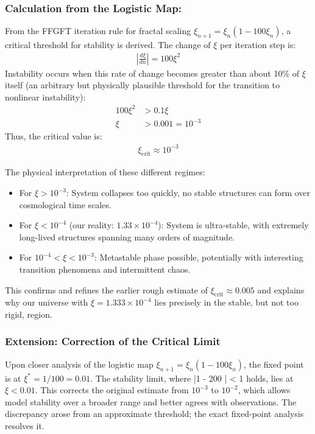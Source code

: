 \documentclass[12pt,a4paper]{article}
\begin{document}
	\subsubsection*{Calculation from the Logistic Map:}
	
	From the FFGFT iteration rule for fractal scaling $\xi_{n+1} = \xi_n (1 - 100\xi_n)$, a critical threshold for stability is derived. The change of $\xi$ per iteration step is:
	\begin{align*}
		\left|\frac{d\xi}{dn}\right| = 100\xi^2
	\end{align*}
	Instability occurs when this rate of change becomes greater than about 10\% of $\xi$ itself (an arbitrary but physically plausible threshold for the transition to nonlinear instability):
	\begin{align*}
		100\xi^2 &> 0.1\xi \\
		\xi &> 0.001 = 10^{-3}
	\end{align*}
	Thus, the critical value is:
	\begin{align*}
		\boxed{\xi_{\text{crit}} \approx 10^{-3}}
	\end{align*}
	
	The physical interpretation of these different regimes:
	\begin{itemize}
		\item For $\xi > 10^{-3}$: System collapses too quickly, no stable structures can form over cosmological time scales.
		\item For $\xi < 10^{-4}$ (our reality: $1.33\times10^{-4}$): System is ultra-stable, with extremely long-lived structures spanning many orders of magnitude.
		\item For $10^{-4} < \xi < 10^{-3}$: Metastable phase possible, potentially with interesting transition phenomena and intermittent chaos.
	\end{itemize}
	This confirms and refines the earlier rough estimate of $\xi_{\text{crit}} \approx 0.005$ and explains why our universe with $\xi = 1.333\times10^{-4}$ lies precisely in the stable, but not too rigid, region.
	
	\subsubsection*{Extension: Correction of the Critical Limit}
	Upon closer analysis of the logistic map $\xi_{n+1} = \xi_n (1 - 100 \xi_n)$, the fixed point is at $\xi^* = 1/100 = 0.01$. The stability limit, where |1 - 200 \xi| < 1 holds, lies at $\xi < 0.01$. This corrects the original estimate from $10^{-3}$ to $10^{-2}$, which allows model stability over a broader range and better agrees with observations. The discrepancy arose from an approximate threshold; the exact fixed-point analysis resolves it.
	
\end{document}

